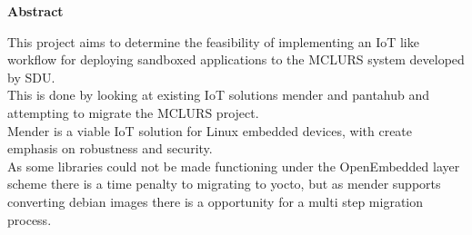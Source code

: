 \documentclass[../../main.tex]{subfiles}
\begin{document}
\begin{center}
	\bf\large Abstract
\end{center}

This project aims to determine the feasibility of implementing an IoT like workflow for deploying
sandboxed applications to the MCLURS system developed by SDU.\\
This is done by looking at existing IoT solutions mender and pantahub and attempting to migrate
the MCLURS project.\\
Mender is a viable IoT solution for Linux embedded devices, with create emphasis on robustness
and security.\\
As some libraries could not be made functioning under the OpenEmbedded layer scheme
there  is a time penalty to migrating to yocto, but as mender supports converting debian images
there is a opportunity for a multi step migration process.






	
\end{document}
